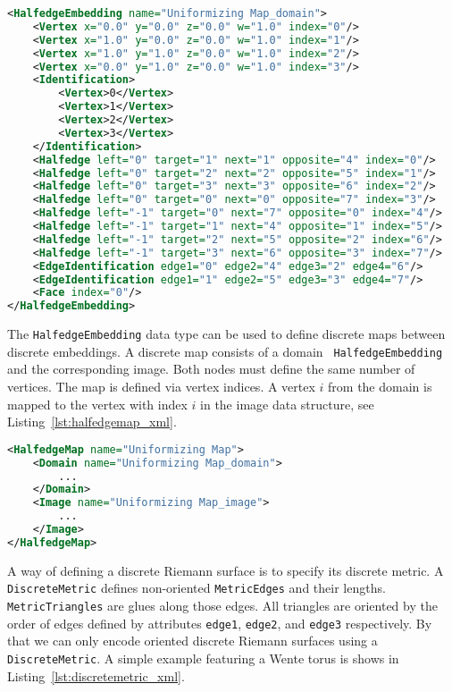 \documentclass[Thesis.tex]{subfiles}
\begin{document}
\begin{lstlisting}[label=lst:halfedge_xml, caption={A torus given as {\tt HalfedegeEmbedding}
with identified edge pairs and vertices.}, numbers=none, language=XML, captionpos=b]
<HalfedgeEmbedding name="Uniformizing Map_domain">
	<Vertex x="0.0" y="0.0" z="0.0" w="1.0" index="0"/>
	<Vertex x="1.0" y="0.0" z="0.0" w="1.0" index="1"/>
	<Vertex x="1.0" y="1.0" z="0.0" w="1.0" index="2"/>
	<Vertex x="0.0" y="1.0" z="0.0" w="1.0" index="3"/>
	<Identification>
		<Vertex>0</Vertex>
		<Vertex>1</Vertex>
		<Vertex>2</Vertex>
		<Vertex>3</Vertex>
	</Identification>
	<Halfedge left="0" target="1" next="1" opposite="4" index="0"/>
	<Halfedge left="0" target="2" next="2" opposite="5" index="1"/>
	<Halfedge left="0" target="3" next="3" opposite="6" index="2"/>
	<Halfedge left="0" target="0" next="0" opposite="7" index="3"/>
	<Halfedge left="-1" target="0" next="7" opposite="0" index="4"/>
	<Halfedge left="-1" target="1" next="4" opposite="1" index="5"/>
	<Halfedge left="-1" target="2" next="5" opposite="2" index="6"/>
	<Halfedge left="-1" target="3" next="6" opposite="3" index="7"/>
	<EdgeIdentification edge1="0" edge2="4" edge3="2" edge4="6"/>
	<EdgeIdentification edge1="1" edge2="5" edge3="3" edge4="7"/>
	<Face index="0"/>
</HalfedgeEmbedding>
\end{lstlisting}

The {\tt HalfedgeEmbedding} data type can be used to define discrete maps
between discrete embeddings. A discrete map consists of a domain {\tt
HalfedgeEmbedding} and the corresponding image. Both nodes must define the same
number of vertices. The map is defined via vertex indices. A vertex $i$ from
the domain is mapped to the vertex with index $i$ in the image data structure,
see Listing~\ref{lst:halfedgemap_xml}.

\begin{lstlisting}[label=lst:halfedgemap_xml, caption={A discrete map is given by a pair of {\tt HalfedgeEmbedding}s, the {\tt Domain} and {\tt Image} of the map. Both are of type {\tt HalfedgeEmbedding}.}, numbers=none, language=XML, captionpos=b]
<HalfedgeMap name="Uniformizing Map">
	<Domain name="Uniformizing Map_domain">
		...
	</Domain>
	<Image name="Uniformizing Map_image">
		...
	</Image>
</HalfedgeMap>
\end{lstlisting}

A way of defining a discrete Riemann surface is to specify its discrete metric.
A {\tt DiscreteMetric} defines non-oriented {\tt MetricEdges} and their
lengths. {\tt MetricTriangles} are glues along those edges. All triangles are
oriented by the order of edges defined by attributes {\tt edge1}, {\tt edge2},
and {\tt edge3} respectively. By that we can only encode oriented discrete
Riemann surfaces using a {\tt DiscreteMetric}.  A simple example featuring a
Wente torus is shows in Listing~\ref{lst:discretemetric_xml}.
\end{document}
